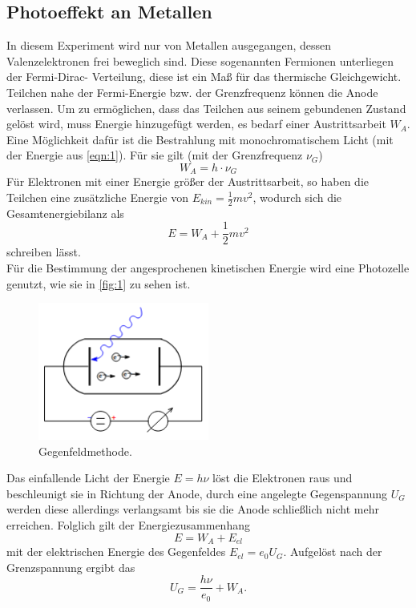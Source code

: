 \subsection{Photoeffekt an Metallen}
In diesem Experiment wird nur von Metallen ausgegangen, dessen Valenzelektronen 
frei beweglich sind. Diese sogenannten Fermionen unterliegen der Fermi-Dirac-
Verteilung, diese ist ein Maß für das thermische Gleichgewicht. Teilchen nahe 
der Fermi-Energie bzw. der Grenzfrequenz können die Anode verlassen. Um
zu ermöglichen, dass das Teilchen aus seinem gebundenen Zustand gelöst wird, muss Energie
hinzugefügt werden, es bedarf einer Austrittsarbeit $W_A$. Eine Möglichkeit
dafür ist die Bestrahlung mit monochromatischem Licht (mit der Energie aus
\autoref{eqn:1}). Für sie gilt (mit der Grenzfrequenz $\nu_G$)
\begin{equation}
    \label{eqn:2}
    W_A = h \cdot \nu_G
\end{equation}
Für Elektronen mit einer Energie größer der Austrittsarbeit, so haben die 
Teilchen eine zusätzliche Energie von $E_{kin} = \frac{1}{2} m v^2$, wodurch sich 
die Gesamtenergiebilanz als 
\begin{equation}
    \label{eqn:3}
    E = W_A + \frac{1}{2} m v^2
\end{equation}
schreiben lässt.
\vspace{0.5em}
\\
Für die Bestimmung der angesprochenen kinetischen Energie wird eine Photozelle 
genutzt, wie sie in \autoref{fig:1} zu sehen ist.
\begin{figure}[H]
    \centering
        \centering
        \includegraphics[width=0.5\textwidth]{Bilder/ggfeld.png}
        \caption{Gegenfeldmethode. \cite{anleitung9}}
    \hfill
    \label{fig:1}
\end{figure}
\noindent Das einfallende Licht der Energie $E= h \nu$ löst die Elektronen raus und
beschleunigt sie in Richtung der Anode, durch eine angelegte Gegenspannung $U_G$
werden diese allerdings verlangsamt bis sie die Anode schließlich nicht mehr 
erreichen. Folglich gilt der Energiezusammenhang
\begin{equation}
    \label{eqn:4}
    E = W_A + E_{el}
\end{equation}
mit der elektrischen Energie des Gegenfeldes $E_{el} = e_0 U_G$. Aufgelöst nach 
der Grenzspannung ergibt das
\begin{equation}
    \label{eqn:5}
    U_G = \frac{h \nu}{e_0} + W_A.
\end{equation}

